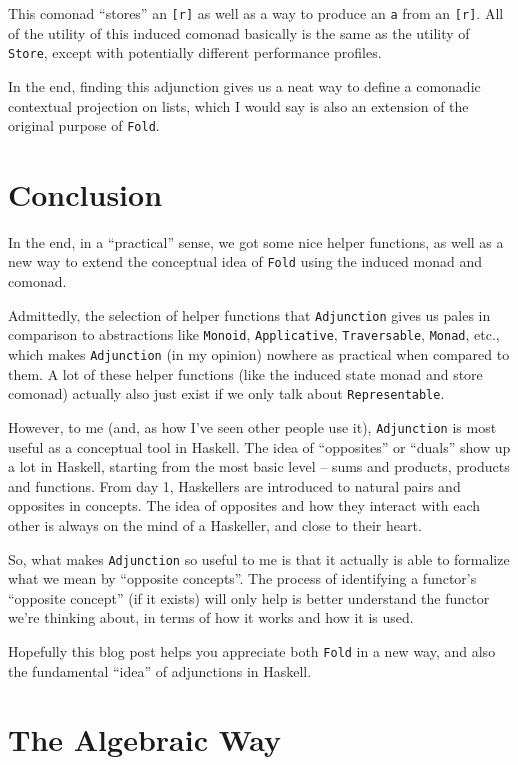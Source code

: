 \documentclass[]{article}
\begin{document}
This comonad ``stores'' an \texttt{{[}r{]}} as well as a way to produce an
\texttt{a} from an \texttt{{[}r{]}}. All of the utility of this induced comonad
basically is the same as the utility of \texttt{Store}, except with potentially
different performance profiles.

In the end, finding this adjunction gives us a neat way to define a comonadic
contextual projection on lists, which I would say is also an extension of the
original purpose of \texttt{Fold}.

\hypertarget{conclusion}{%
\section{Conclusion}\label{conclusion}}

In the end, in a ``practical'' sense, we got some nice helper functions, as well
as a new way to extend the conceptual idea of \texttt{Fold} using the induced
monad and comonad.

Admittedly, the selection of helper functions that \texttt{Adjunction} gives us
pales in comparison to abstractions like \texttt{Monoid}, \texttt{Applicative},
\texttt{Traversable}, \texttt{Monad}, etc., which makes \texttt{Adjunction} (in
my opinion) nowhere as practical when compared to them. A lot of these helper
functions (like the induced state monad and store comonad) actually also just
exist if we only talk about \texttt{Representable}.

However, to me (and, as how I've seen other people use it), \texttt{Adjunction}
is most useful as a conceptual tool in Haskell. The idea of ``opposites'' or
``duals'' show up a lot in Haskell, starting from the most basic level -- sums
and products, products and functions. From day 1, Haskellers are introduced to
natural pairs and opposites in concepts. The idea of opposites and how they
interact with each other is always on the mind of a Haskeller, and close to
their heart.

So, what makes \texttt{Adjunction} so useful to me is that it actually is able
to formalize what we mean by ``opposite concepts''. The process of identifying a
functor's ``opposite concept'' (if it exists) will only help is better
understand the functor we're thinking about, in terms of how it works and how it
is used.

Hopefully this blog post helps you appreciate both \texttt{Fold} in a new way,
and also the fundamental ``idea'' of adjunctions in Haskell.

\hypertarget{the-algebraic-way}{%
\section{The Algebraic Way}\label{the-algebraic-way}}
\end{document}
